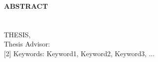 \clearpage
\begin{center}
    \MakeUppercase{\textbf{Abstract}} \\ [3\baselineskip]
    \MakeUppercase{\thesistitle} \\[3\baselineskip]
    \MakeUppercase{\student} \\[\baselineskip]
    \MakeUppercase{\major \degreeabv Thesis, \month~\year} \\[\baselineskip]
    Thesis Advisor: \advisor \\
    [2\baselineskip]
    Keywords: Keyword1, Keyword2, Keyword3, ... \\[2\baselineskip]
\end{center}

\onehalfspacing

\lipsum[1]